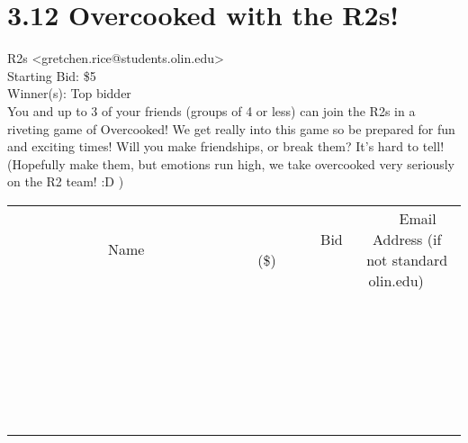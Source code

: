 \documentclass[11pt]{article}
\begin{document}
					\section*{3.12 Overcooked with the R2s!}
					R2s <gretchen.rice@students.olin.edu> \\
					Starting Bid: \$5 \\
					Winner(s): Top bidder \\
					You and up to 3 of your friends (groups of 4 or less) can join the R2s in a riveting game of Overcooked! We get really into this game so be prepared for fun and exciting times! Will you make friendships, or break them? It's hard to tell! (Hopefully make them, but emotions run high, we take overcooked very seriously on the R2 team! :D ) \\
					[6ex]
					\begin{tabular}{c c c}
						~~~~~~~~~~~~~Name~~~~~~~~~~~~~ & ~~~~~~~~~Bid (\$)~~~~~~~~~ & ~~~Email Address (if not standard olin.edu)~~~ \\
				
 & & \\
\hline
 & & \\
\hline
 & & \\
\hline
 & & \\
\hline
 & & \\
\hline
 & & \\
\hline
 & & \\
\hline
 & & \\
\hline
 & & \\
\hline
 & & \\
\hline
 & & \\
\hline
 & & \\
\hline
 & & \\
\hline
 & & \\
\hline
 & & \\
\hline
 & & \\
\hline
 & & \\
\hline
 & & \\
\hline
 & & \\
\hline
 & & \\
\hline
 & & \\
\hline
 & & \\
\hline
 & & \\
\hline
 & & \\
\hline
 & & \\
\hline
 & & \\
\hline
					\end{tabular}
					\clearpage
				
\end{document}
